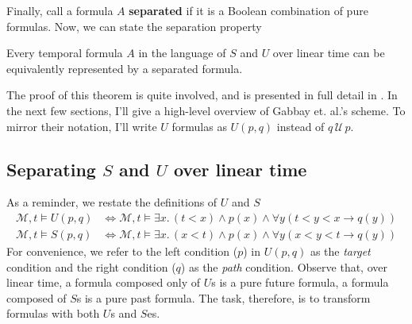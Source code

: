 \documentclass[a4paper,UKenglish,cleveref, autoref, thm-restate]{lipics-v2021}
\begin{document}
Finally, call a formula $A$ \textbf{separated} if it is a Boolean combination of pure formulas. Now, we can state the separation property
\begin{theorem}
    \label{separation-theorem-linear-time}
    Every temporal formula $A$ in the language of $S$ and $U$ over linear time can be equivalently represented by a separated formula.
\end{theorem}

The proof of this theorem is quite involved, and is presented in full detail in \cite{gabbay1994}. In the next few sections, I'll give a high-level overview of Gabbay et. al.'s scheme. To mirror their notation, I'll write $U$ formulas as $U(p, q)$ instead of $q \,\mathcal{U}\, p$.

\subsection{Separating $S$ and $U$ over linear time}

As a reminder, we restate the definitions of $U$ and $S$
\begin{equation*}
    \begin{aligned}
        \mathcal{M}, t \vDash U(p, q) &\Longleftrightarrow \mathcal{M}, t \vDash \exists x.\, (t < x) \land p(x) \land \forall y \left( t < y < x \to q\left( y \right) \right)\\
        \mathcal{M}, t \vDash S(p, q) &\Longleftrightarrow \mathcal{M}, t \vDash \exists x.\, (x < t) \land p(x) \land \forall y \left( x < y < t \to q\left( y \right) \right)
    \end{aligned}
\end{equation*}
For convenience, we refer to the left condition ($p$) in $U(p, q)$ as the \textit{target} condition and the right condition ($q$) as the \textit{path} condition. Observe that, over linear time, a formula composed only of $U$s is a pure future formula, a formula composed of $S$s is a pure past formula. The task, therefore, is to transform formulas with both $U$s and $S$es.
\end{document}

